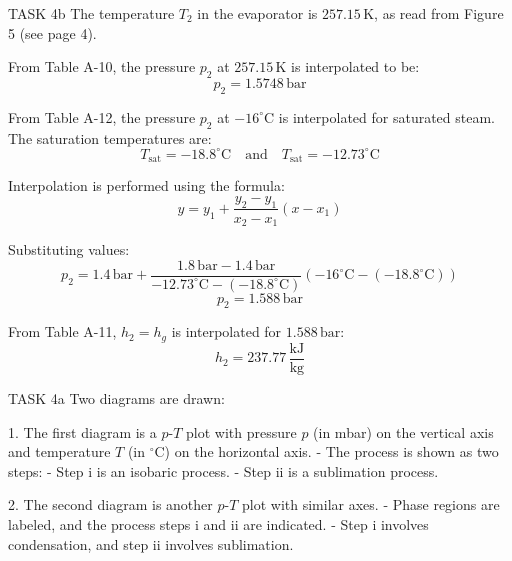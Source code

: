 TASK 4b  
The temperature \( T_2 \) in the evaporator is \( 257.15 \, \text{K} \), as read from Figure 5 (see page 4).  

From Table A-10, the pressure \( p_2 \) at \( 257.15 \, \text{K} \) is interpolated to be:  
\[
p_2 = 1.5748 \, \text{bar}
\]  

From Table A-12, the pressure \( p_2 \) at \( -16^\circ\text{C} \) is interpolated for saturated steam. The saturation temperatures are:  
\[
T_{\text{sat}} = -18.8^\circ\text{C} \quad \text{and} \quad T_{\text{sat}} = -12.73^\circ\text{C}
\]  

Interpolation is performed using the formula:  
\[
y = y_1 + \frac{y_2 - y_1}{x_2 - x_1} (x - x_1)
\]  

Substituting values:  
\[
p_2 = 1.4 \, \text{bar} + \frac{1.8 \, \text{bar} - 1.4 \, \text{bar}}{-12.73^\circ\text{C} - (-18.8^\circ\text{C})} (-16^\circ\text{C} - (-18.8^\circ\text{C}))
\]  
\[
p_2 = 1.588 \, \text{bar}
\]  

From Table A-11, \( h_2 = h_g \) is interpolated for \( 1.588 \, \text{bar} \):  
\[
h_2 = 237.77 \, \frac{\text{kJ}}{\text{kg}}
\]  

TASK 4a  
Two diagrams are drawn:  

1. The first diagram is a \( p \)-\( T \) plot with pressure \( p \) (in mbar) on the vertical axis and temperature \( T \) (in \( ^\circ\text{C} \)) on the horizontal axis.  
   - The process is shown as two steps:  
     - Step i is an isobaric process.  
     - Step ii is a sublimation process.  

2. The second diagram is another \( p \)-\( T \) plot with similar axes.  
   - Phase regions are labeled, and the process steps i and ii are indicated.  
   - Step i involves condensation, and step ii involves sublimation.